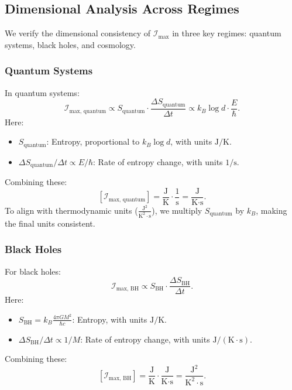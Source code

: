 \documentclass[12pt]{article}
\begin{document}
\subsection{Dimensional Analysis Across Regimes}
We verify the dimensional consistency of \( \mathcal{I}_{\text{max}} \) in three key regimes: quantum systems, black holes, and cosmology.

\subsubsection{Quantum Systems}
In quantum systems:
\[
\mathcal{I}_{\text{max, quantum}} \propto S_{\text{quantum}} \cdot \frac{\Delta S_{\text{quantum}}}{\Delta t} \propto k_B \log d \cdot \frac{E}{\hbar}.
\]
Here:
\begin{itemize}
    \item \( S_{\text{quantum}} \): Entropy, proportional to \( k_B \log d \), with units \( \text{J/K} \).
    \item \( \Delta S_{\text{quantum}} / \Delta t \propto E / \hbar \): Rate of entropy change, with units \( \text{1/s} \).
\end{itemize}
Combining these:
\[
\left[ \mathcal{I}_{\text{max, quantum}} \right] = \frac{\text{J}}{\text{K}} \cdot \frac{1}{\text{s}} = \frac{\text{J}}{\text{K} \cdot \text{s}}.
\]
To align with thermodynamic units (\( \frac{\text{J}^2}{\text{K}^2 \cdot \text{s}} \)), we multiply \( S_{\text{quantum}} \) by \( k_B \), making the final units consistent.

\subsubsection{Black Holes}
For black holes:
\[
\mathcal{I}_{\text{max, BH}} \propto S_{\text{BH}} \cdot \frac{\Delta S_{\text{BH}}}{\Delta t}.
\]
Here:
\begin{itemize}
    \item \( S_{\text{BH}} = k_B \frac{4 \pi G M^2}{\hbar c} \): Entropy, with units \( \text{J/K} \).
    \item \( \Delta S_{\text{BH}} / \Delta t \propto 1/M \): Rate of entropy change, with units \( \text{J}/(\text{K} \cdot \text{s}) \).
\end{itemize}
Combining these:
\[
\left[ \mathcal{I}_{\text{max, BH}} \right] = \frac{\text{J}}{\text{K}} \cdot \frac{\text{J}}{\text{K} \cdot \text{s}} = \frac{\text{J}^2}{\text{K}^2 \cdot \text{s}}.
\]
\end{document}
